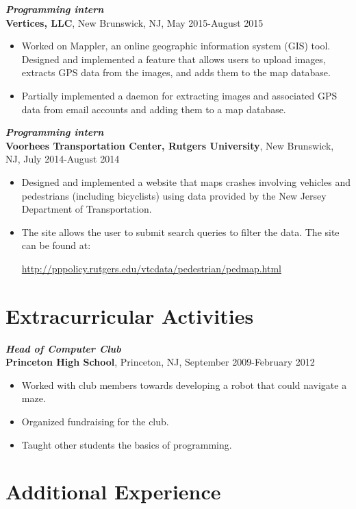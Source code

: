 \documentclass[12pt]{article}
\begin{document}
\textit{\textbf{Programming intern}} \\
\textbf{Vertices, LLC}, New Brunswick, NJ, May 2015-August 2015
\begin{itemize}
\item
Worked on Mappler, an online geographic information system (GIS) tool. Designed and implemented a feature that allows users to upload images, extracts GPS data from the images, and adds them to the map database.
\item
Partially implemented a daemon for extracting images and associated GPS data from email accounts and adding them to a map database.
\end{itemize}

\textit{\textbf{Programming intern}} \\
\textbf{Voorhees Transportation Center, Rutgers University}, New Brunswick, NJ, July 2014-August 2014
\begin{itemize}
\item
Designed and implemented a website that maps crashes involving vehicles and pedestrians (including bicyclists) using data provided by the New Jersey Department of Transportation.
\item
The site allows the user to submit search queries to filter the data. The site can be found at:
\begin{center}
\url{http://pppolicy.rutgers.edu/vtcdata/pedestrian/pedmap.html}
\end{center}
\end{itemize}

\section*{Extracurricular Activities}

\textit{\textbf{Head of Computer Club}} \\
\textbf{Princeton High School}, Princeton, NJ, September 2009-February 2012
\begin{itemize}
\item
Worked with club members towards developing a robot that could navigate a maze.
\item
Organized fundraising for the club.
\item
Taught other students the basics of programming.
\end{itemize}

\iffalse

\section*{Additional Experience}
\end{document}
